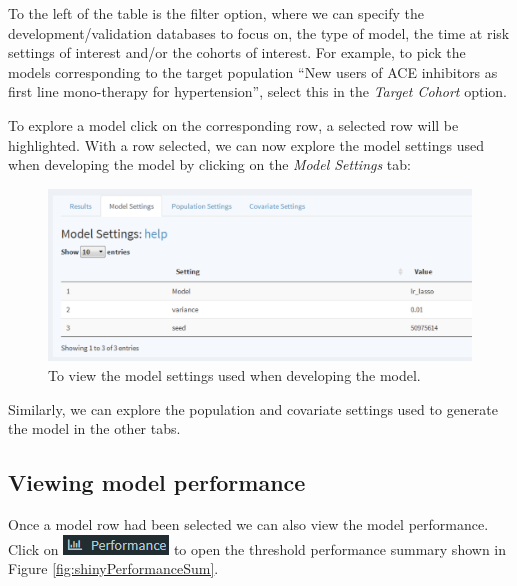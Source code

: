 \documentclass[11pt]{book}
\theoremstyle{definition}
\theoremstyle{definition}
\theoremstyle{definition}
\theoremstyle{remark}
\begin{document}
To the left of the table is the filter option, where we can specify the development/validation databases to focus on, the type of model, the time at risk settings of interest and/or the cohorts of interest. For example, to pick the models corresponding to the target population ``New users of ACE inhibitors as first line mono-therapy for hypertension'', select this in the \emph{Target Cohort} option.

To explore a model click on the corresponding row, a selected row will be highlighted. With a row selected, we can now explore the model settings used when developing the model by clicking on the \emph{Model Settings} tab:

\begin{figure}

{\centering \includegraphics[width=1\linewidth]{images/PatientLevelPrediction/shiny/shinyModel} 

}

\caption{To view the model settings used when developing the model.}\label{fig:shinyModel}
\end{figure}

Similarly, we can explore the population and covariate settings used to generate the model in the other tabs.

\hypertarget{viewing-model-performance}{%
\subsection{Viewing model performance}\label{viewing-model-performance}}

Once a model row had been selected we can also view the model performance. Click on \includegraphics{images/PatientLevelPrediction/performance.png} to open the threshold performance summary shown in Figure \ref{fig:shinyPerformanceSum}.
\end{document}
